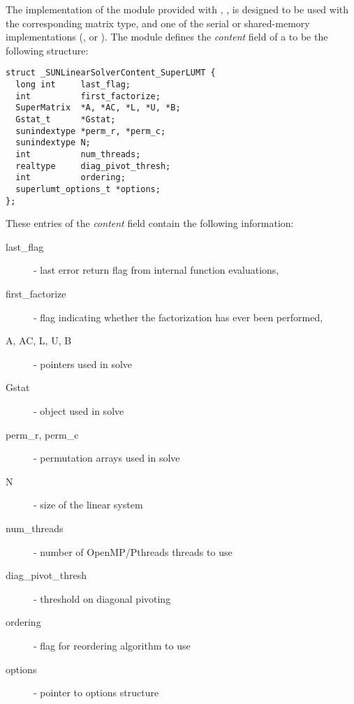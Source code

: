 
The {\superlumt} implementation of the {\sunlinsol} module provided with
{\sundials}, {\sunlinsolslumt}, is designed to be used with the
corresponding {\sunmatsparse} matrix type, and one of the serial or
shared-memory {\nvector} implementations ({\nvecs}, {\nvecopenmp} or 
{\nvecpthreads}).  The {\sunlinsolslumt} module defines the {\em
content} field of a  to be the following structure:
\begin{verbatim} 
struct _SUNLinearSolverContent_SuperLUMT {
  long int     last_flag;
  int          first_factorize;
  SuperMatrix  *A, *AC, *L, *U, *B;
  Gstat_t      *Gstat;
  sunindextype *perm_r, *perm_c;
  sunindextype N;
  int          num_threads;
  realtype     diag_pivot_thresh; 
  int          ordering;
  superlumt_options_t *options;
};
\end{verbatim}
These entries of the \emph{content} field contain the following
information:
\begin{description}
  \item[last\_flag] - last error return flag from internal function evaluations,
  \item[first\_factorize] - flag indicating whether the factorization
    has ever been performed, 
  \item[A, AC, L, U, B] -  pointers used in solve
  \item[Gstat] -  object used in solve
  \item[perm\_r, perm\_c] - permutation arrays used in solve
  \item[N] - size of the linear system
  \item[num\_threads] - number of OpenMP/Pthreads threads to use
  \item[diag\_pivot\_thresh] - threshold on diagonal pivoting
  \item[ordering] - flag for reordering algorithm to use
  \item[options] - pointer to {\superlumt} options structure
\end{description}

